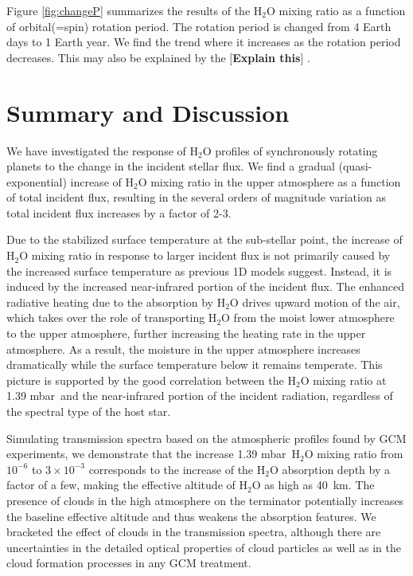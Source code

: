 \documentclass[11pt,numberedappendix,twocolappendix,]{emulateapj}
\def\water{H$_2$O }
\def\preslevel{1.39 mbar\ }
\def\memo#1{\color{red}$[${\bf #1}$]$ \color{black}}
\begin{document}
Figure \ref{fig:changeP} summarizes the results of the \water mixing ratio as a function of orbital(=spin) rotation period. 
The rotation period is changed from 4 Earth days to 1 Earth year. 
We find the trend where it increases as the rotation period decreases. 
This may also be explained by the 
\memo{Explain this}. 



\section{Summary and Discussion}
\label{s:summary}

We have investigated the response of \water profiles of synchronously rotating planets to the change in the incident stellar flux. 
We find a gradual (quasi-exponential) increase of \water mixing ratio in the upper atmosphere as a function of total incident flux, resulting in the several orders of magnitude variation as total incident flux increases by a factor of 2-3. 

Due to the stabilized surface temperature at the sub-stellar point, the increase of \water mixing ratio in response to larger incident flux is not primarily caused by the increased surface temperature as previous 1D models suggest. 
Instead, it is induced by the increased near-infrared portion of the incident flux. 
The enhanced radiative heating due to the absorption by \water drives upward motion of the air, which takes over the role of transporting \water from the moist lower atmosphere to the upper atmosphere, further increasing the heating rate in the upper atmosphere.
As a result, the moisture in the upper atmosphere increases dramatically while the surface temperature below it remains temperate. 
This picture is supported by the good correlation between the \water mixing ratio at \preslevel and the near-infrared portion of the incident radiation, regardless of the spectral type of the host star. 

Simulating transmission spectra based on the atmospheric profiles found by GCM experiments, 
we demonstrate that the increase \preslevel \water mixing ratio from $10^{-6}$ to $3 \times 10^{-3}$ corresponds to the increase of the \water absorption depth by a factor of a few, making the effective altitude of \water as high as 40~km. 
The presence of clouds in the high atmosphere on the terminator potentially increases the baseline effective altitude and thus weakens the absorption features. 
We bracketed the effect of clouds in the transmission spectra, 
although there are uncertainties in the detailed optical properties of cloud particles as well as in the cloud formation processes in any GCM treatment. 
\end{document}
